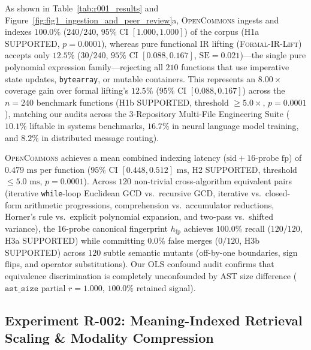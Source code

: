 \documentclass[10pt,twocolumn]{article}
\begin{document}
As shown in Table~\ref{tab:r001_results} and Figure~\ref{fig:fig1_ingestion_and_peer_review}a, \textsc{OpenCommons} ingests and indexes $100.0\%$ ($240/240$, $95\%$ CI $[1.000, 1.000]$) of the corpus (H1a SUPPORTED, $p = 0.0001$), whereas pure functional IR lifting (\textsc{Formal-IR-Lift}) accepts only $12.5\%$ ($30/240$, $95\%$ CI $[0.088, 0.167]$, $\text{SE} = 0.021$)—the single pure polynomial expression family—rejecting all $210$ functions that use imperative state updates, \texttt{bytearray}, or mutable containers. This represents an $8.00\times$ coverage gain over formal lifting's $12.5\%$ ($95\%$ CI $[0.088, 0.167]$) across the $n=240$ benchmark functions (H1b SUPPORTED, threshold $\ge 5.0\times$, $p = 0.0001$), matching our audits across the 3-Repository Multi-File Engineering Suite ($10.1\%$ liftable in systems benchmarks, $16.7\%$ in neural language model training, and $8.2\%$ in distributed message routing).

\textsc{OpenCommons} achieves a mean combined indexing latency ($\text{sid} + 16\text{-probe }\text{fp}$) of $0.479\text{ ms}$ per function ($95\%$ CI $[0.448, 0.512]\text{ ms}$, H2 SUPPORTED, threshold $\le 5.0\text{ ms}$, $p = 0.0001$). Across $120$ non-trivial cross-algorithm equivalent pairs (iterative \texttt{while}-loop Euclidean GCD vs.\ recursive GCD, iterative vs.\ closed-form arithmetic progressions, comprehension vs.\ accumulator reductions, Horner's rule vs.\ explicit polynomial expansion, and two-pass vs.\ shifted variance), the 16-probe canonical fingerprint $h_{\text{fp}}$ achieves $100.0\%$ recall ($120/120$, H3a SUPPORTED) while committing $0.0\%$ false merges ($0/120$, H3b SUPPORTED) across $120$ subtle semantic mutants (off-by-one boundaries, sign flips, and operator substitutions). Our OLS confound audit confirms that equivalence discrimination is completely unconfounded by AST size difference ($\texttt{ast\_size}$ partial $r = 1.000$, $100.0\%$ retained signal).

\subsection{Experiment R-002: Meaning-Indexed Retrieval Scaling \& Modality Compression}
\label{sec:exp_r002}

\begin{table}[t]
\centering
\caption{\textbf{Pre-registered hypothesis outcomes for Experiment R-002: Retrieval Precision, Scaling Law ($N=120 \to 5{,}000$), and Representation Token Compression.} Auto-generated by \texttt{ResearchHarness} (Artifact SHA-256: \texttt{dc0cbc3f5dfc}).}
\label{tab:r002_results}
\footnotesize

\end{table}
\end{document}
